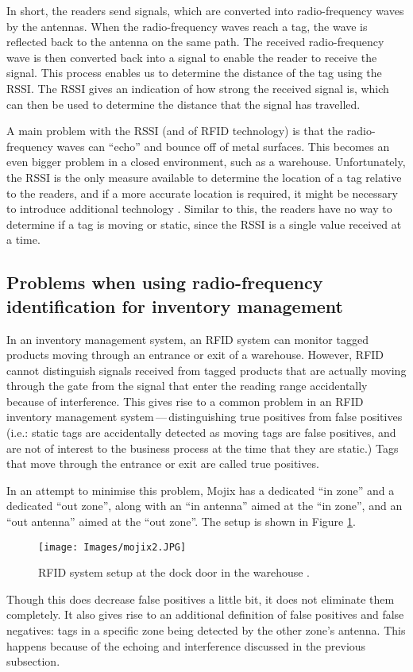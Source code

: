 \documentclass{article}
\begin{document}
In short, the readers send signals, which are converted into radio-frequency waves by the antennas.
When the radio-frequency waves reach a tag, the wave is reflected back to the antenna on the same path.
The received radio-frequency wave is then converted back into a signal to enable the reader to receive the signal.
This process enables us to determine the distance of the tag using the \ac{RSSI}.
The \ac{RSSI} gives an indication of how strong the received signal is, which can then be used to determine the distance that the signal has travelled.

A main problem with the \ac{RSSI} (and of \ac{RFID} technology) is that the radio-frequency waves can ``echo'' and bounce off of metal surfaces. 
This becomes an even bigger problem in a closed environment, such as a warehouse.
Unfortunately, the \ac{RSSI} is the only measure available to determine the location of a tag relative to the readers, and if a more accurate location is required, it might be necessary to introduce additional technology \citep{ref:about_rssi}.
Similar to this, the readers have no way to determine if a tag is moving or static, since the \ac{RSSI} is a single value received at a time.

\subsection{Problems when using radio-frequency identification for inventory management}

In an inventory management system, an \ac{RFID} system can monitor tagged products moving through an entrance or exit of a warehouse. 
However, \ac{RFID} cannot distinguish signals received from tagged products that are actually moving through the gate from the signal that enter the reading range accidentally because of interference.
This gives rise to a common problem in an \ac{RFID} inventory management system\,---\,distinguishing true positives from false positives (i.e.: static tags are accidentally detected as moving tags are false positives, and are not of interest to the business process at the time that they are static.)
Tags that move through the entrance or exit are called true positives.

In an attempt to minimise this problem, Mojix has a dedicated ``in zone'' and a dedicated ``out zone'', along with an ``in antenna'' aimed at the ``in zone'', and an ``out antenna'' aimed at the ``out zone''.
The setup is shown in Figure \ref{fig:dock_door}.
%
\begin{figure}[h]
    \centering
    \texttt{[image: Images/mojix2.JPG]}
    \caption{RFID system setup at the dock door in the warehouse \citep{ref:about_mojix}.}
    \label{fig:dock_door}
\end{figure}
%
Though this does decrease false positives a little bit, it does not eliminate them completely.
It also gives rise to an additional definition of false positives and false negatives: tags in a specific zone being detected by the other zone's antenna.
This happens because of the echoing and interference discussed in the previous subsection.
\end{document}
